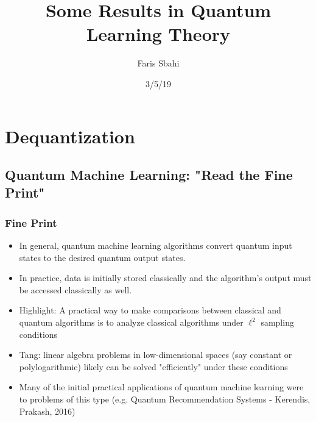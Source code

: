 \documentclass{beamer}
\title{Some Results in Quantum Learning Theory}
\author[Sbahi] %
{Faris Sbahi}
\date{3/5/19}
\newcommand\0{\mathbf{0}}
\newcommand\<{\langle}
\renewcommand\>{\rangle}
\begin{document}
\maketitle


\section{Dequantization}

\subsection{Quantum Machine Learning: "Read the Fine Print"}

\begin{frame}
\frametitle{Fine Print}
\begin{itemize}
\item In general, quantum machine learning algorithms convert quantum input states to the desired quantum output states. 
\item In practice, data is initially stored classically and the algorithm's output must be accessed classically as well.
\item Highlight: A practical way to make comparisons between classical and quantum algorithms is to analyze classical algorithms under $\ell^2$ sampling conditions
\item Tang: linear algebra problems in low-dimensional spaces (say constant or polylogarithmic) likely can be solved "efficiently" under these conditions
\item Many of the initial practical applications of quantum machine learning were to problems of this type (e.g. Quantum Recommendation Systems - Kerendis, Prakash, 2016)
\end{itemize}
\end{frame}
\end{document}

